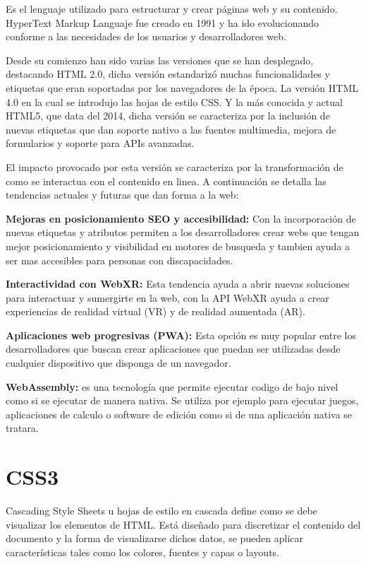 \documentclass[a4paper, 12pt]{book}
\begin{document}
Es el lenguaje utilizado para estructurar y crear páginas web y su contenido. HyperText Markup Languaje fue creado en 1991 y ha ido evolucionando conforme a las necesidades de los usuarios y desarrolladores web.

Desde su comienzo han sido varias las versiones que se han desplegado, destacando HTML 2.0, dicha versión estandarizó muchas funcionalidades y etiquetas que eran soportadas por los navegadores de la época. La versión HTML 4.0 en la cual se introdujo las hojas de estilo CSS. Y la más conocida y actual HTML5, que data del 2014, dicha versión se caracteriza por la inclusión de nuevas etiquetas que dan soporte nativo a las fuentes multimedia, mejora de formularios y soporte para APIs avanzadas.

El impacto provocado por esta versión se caracteriza por la transformación de como se interactua con el contenido en linea. A continuación se detalla las tendencias actuales y futuras que dan forma a la web:

\textbf{Mejoras en posicionamiento SEO y accesibilidad:} Con la incorporación de nuevas etiquetas y atributos permiten a los desarrolladores crear webs que tengan mejor posicionamiento y visibilidad en motores de busqueda y tambien ayuda a ser mas accesibles para personas con discapacidades.

\textbf{Interactividad con WebXR:} Esta tendencia ayuda a abrir nuevas soluciones para interactuar y sumergirte en la web, con la API WebXR ayuda a crear experiencias de realidad virtual (VR) y de realidad aumentada (AR).

\textbf{Aplicaciones web progresivas (PWA):} Esta opción es muy popular entre los desarrolladores que buscan crear aplicaciones que puedan ser utilizadas desde cualquier dispositivo que disponga de un navegador.

\textbf{WebAssembly:} es una tecnología que permite ejecutar codigo de bajo nivel como si se ejecutar de manera nativa. Se utiliza por ejemplo para ejecutar juegos, aplicaciones de calculo o software de edición como si de una aplicación nativa se tratara.

\section{CSS3}
Cascading Style Sheets u hojas de estilo en cascada define como se debe visualizar los elementos de HTML. Está diseñado para discretizar el contenido del documento y la forma de visualizarse dichos datos, se pueden aplicar características tales como los colores, fuentes y capas o layouts.
\end{document}
